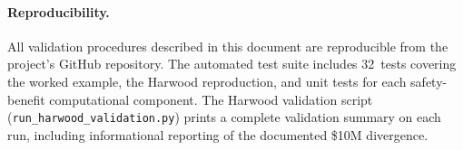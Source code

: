 \paragraph{Reproducibility.} All validation procedures described in this
document are reproducible from the project's GitHub repository. The
automated test suite includes 32~tests covering the worked example, the
Harwood reproduction, and unit tests for each safety-benefit computational
component. The Harwood validation script
(\texttt{run\_harwood\_validation.py}) prints a complete validation summary
on each run, including informational reporting of the documented \$10M
divergence.



